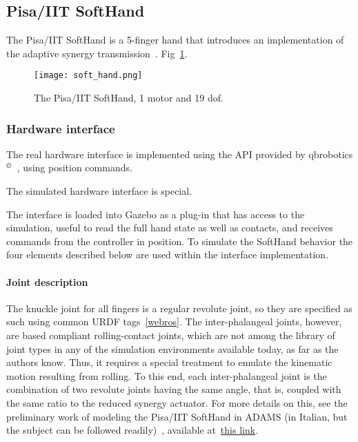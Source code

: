 \subsection{Pisa/IIT SoftHand}
\label{sec:softhand}

The Pisa/IIT SoftHand is a 5-finger hand that introduces an implementation of the adaptive synergy transmission~\cite{Catalano2014Adaptive}. Fig~\ref{fig:soft_hand}.

\begin{figure}[b]
\centering
\texttt{[image: soft\_hand.png]}
\caption{The Pisa/IIT SoftHand, 1 motor and 19 dof.}
\label{fig:soft_hand}
\end{figure}

\subsubsection{Hardware interface}

The real hardware interface is implemented using the API provided by qbrobotics$^{\copyright}$~\cite{qbrobotics_software}, using position commands. 

The simulated hardware interface is special. 

The interface is loaded into Gazebo as a plug-in that has access to the simulation, useful to read the full hand state as well as contacts, and receives commands from the controller in position. To simulate the SoftHand behavior the four elements described below are used within the interface implementation.

\paragraph{Joint description} The knuckle joint for all fingers is a regular revolute joint, so they are specified as such using common URDF tags~\ref{webros}. The inter-phalangeal joints, however, are based compliant rolling-contact joints, which are not among the library of joint types in any of the simulation environments available today, as far as the authors know. Thus, it requires a special treatment to emulate the kinematic motion resulting from rolling. To this end, each inter-phalangeal joint is the combination of two revolute joints having the same angle, that is, coupled with the same ratio to the reduced synergy actuator. For more details on this, see the preliminary work of modeling the Pisa/IIT SoftHand in ADAMS (in Italian, but the subject can be followed readily)~\cite{Piazza2013Studio}, available at~\href{./attachedPapers/CristinaPiazzaReport.pdf}{this link}.


